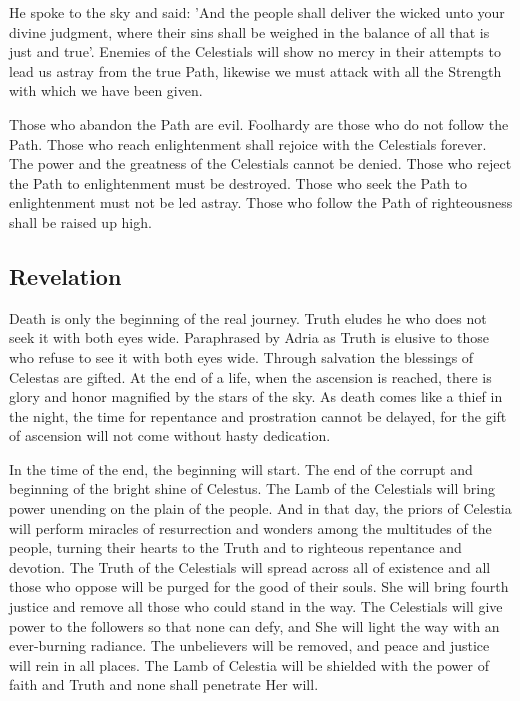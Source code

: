 He spoke to the sky and said: 'And the people shall deliver the wicked unto your divine judgment, where their sins shall be weighed in the balance of all that is just and true'. Enemies of the Celestials will show no mercy in their attempts to lead us astray from the true Path, likewise we must attack with all the Strength with which we have been given. 

Those who abandon the Path are evil. Foolhardy are those who do not follow the Path. Those who reach enlightenment shall rejoice with the Celestials forever. The power and the greatness of the Celestials cannot be denied. Those who reject the Path to enlightenment must be destroyed. Those who seek the Path to enlightenment must not be led astray. Those who follow the Path of righteousness shall be raised up high. 

\subsection{Revelation}

Death is only the beginning of the real journey. Truth eludes he who does not seek it with both eyes wide. Paraphrased by Adria as Truth is elusive to those who refuse to see it with both eyes wide. Through salvation the blessings of Celestas are gifted. At the end of a life, when the ascension is reached, there is glory and honor magnified by the stars of the sky. As death comes like a thief in the night, the time for repentance and prostration cannot be delayed, for the gift of ascension will not come without hasty dedication.

In the time of the end, the beginning will start. The end of the corrupt and beginning of the bright shine of Celestus. The Lamb of the Celestials will bring power unending on the plain of the people. And in that day, the priors of Celestia will perform miracles of resurrection and wonders among the multitudes of the people, turning their hearts to the Truth and to righteous repentance and devotion. The Truth of the Celestials will spread across all of existence and all those who oppose will be purged for the good of their souls. She will bring fourth justice and remove all those who could stand in the way. The Celestials will give power to the followers so that none can defy, and She will light the way with an ever-burning radiance. The unbelievers will be removed, and peace and justice will rein in all places. The Lamb of Celestia will be shielded with the power of faith and Truth and none shall penetrate Her will.	

